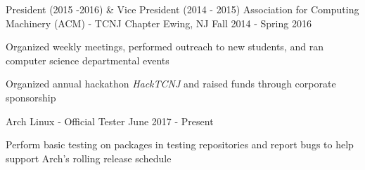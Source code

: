
%
%

\begin{cventries}

  \cventry
  {President (2015 -2016) \& Vice President (2014 - 2015)} %
  {Association for Computing Machinery (ACM) - TCNJ Chapter} %
  {Ewing, NJ} %
  {Fall 2014 - Spring 2016} %
  {
    \begin{cvitems} %
    \item {Organized weekly meetings, performed outreach to new students, and ran computer science departmental events}
    \item {Organized annual hackathon \emph{HackTCNJ} and raised funds through corporate sponsorship}
    \end{cvitems}
  }

  \bproject
    {Arch Linux - Official Tester}
    {June 2017 - Present} %
    {
      \begin{cvitems} %
        \item {Perform basic testing on packages in testing repositories and report bugs to help support Arch's rolling release schedule}
      \end{cvitems}
    }

\end{cventries}
